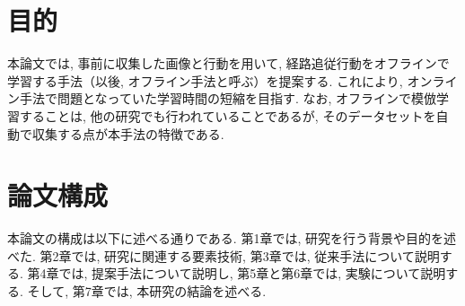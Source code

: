 \newpage
\section{目的}
本論文では, 事前に収集した画像と行動を用いて, 経路追従行動をオフラインで学習する手法（以後, オフライン手法と呼ぶ）を提案する. これにより, オンライン手法で問題となっていた学習時間の短縮を目指す. なお, オフラインで模倣学習することは, 他の研究でも行われていることであるが, そのデータセットを自動で収集する点が本手法の特徴である. 
\section{論文構成}
本論文の構成は以下に述べる通りである. 第1章では, 研究を行う背景や目的を述べた. 第2章では, 研究に関連する要素技術, 第3章では, 従来手法について説明する. 第4章では, 提案手法について説明し, 第5章と第6章では, 実験について説明する. そして, 第7章では, 本研究の結論を述べる. 
     
